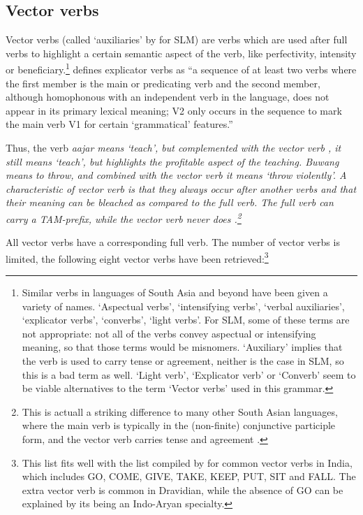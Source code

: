 \subsection{Vector verbs}\label{sec:wc:Vectorverbs}
Vector verbs  \citep{Pray1970,Hook1974,Masica1991} (called `auxiliaries' by \citet{SmithEtAl2007} for SLM) are verbs which are used after full verbs to highlight a certain semantic aspect of the verb, like perfectivity, intensity or beneficiary.\footnote{Similar verbs in languages of South Asia and beyond have been given a variety of names. `Aspectual verbs', `intensifying verbs', `verbal auxiliaries', `explicator verbs', `converbs', `light verbs'. For SLM, some of these terms are not appropriate: not all of the verbs convey aspectual or intensifying meaning, so that those terms would be  misnomers. `Auxiliary' implies that the verb is used to carry tense or agreement, neither is the case in SLM, so this is a bad term as well. `Light verb', `Explicator verb' or `Converb' seem to be viable alternatives to the term `Vector verbs' used in this grammar.}
\citet{AbbiEtAl1991EVC} defines explicator verbs as ``a sequence of at least two verbs where the first member is the main or predicating verb and the second member, although homophonous with an independent verb in the language, does not appear in its primary  lexical meaning; V2 only occurs  in the sequence to mark the main verb V1 for certain `grammatical' features.''

Thus, the verb \em aajar \em means `teach', but complemented with the vector verb , it still means `teach', but highlights the profitable aspect of the teaching. \em Buwang \em means to throw, and combined with the vector verb  it means `throw violently'. A characteristic of vector verb is that they always occur after another verbs and that their meaning can be bleached as compared to the full verb. The full verb can carry a TAM-prefix, while the vector verb never does \citet[171]{SmithEtAl2007}.\footnote{This is actuall a striking difference to many other South Asian languages, where the main verb is typically in the (non-finite) conjunctive participle form, and the vector verb carries tense and agreement \citep[141]{Masica1976}. }

All vector verbs have a corresponding full verb. The number of vector verbs is limited, the following eight vector verbs have been retrieved:\footnote{This list fits well with the list compiled by \citet[173f]{AbbiEtAl1991EVC} for common vector verbs in India, which includes GO, COME, GIVE, TAKE, KEEP, PUT, SIT and FALL. The extra vector verb  is common in Dravidian, while the absence of GO can be explained by its being an Indo-Aryan specialty.}

